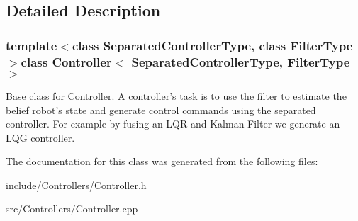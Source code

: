 \subsection{\-Detailed \-Description}
\subsubsection*{template$<$class \-Separated\-Controller\-Type, class \-Filter\-Type$>$class Controller$<$ Separated\-Controller\-Type, Filter\-Type $>$}

\-Base class for \hyperlink{class_controller}{\-Controller}. \-A controller's task is to use the filter to estimate the belief robot's state and generate control commands using the separated controller. \-For example by fusing an \-L\-Q\-R and \-Kalman \-Filter we generate an \-L\-Q\-G controller. 

\-The documentation for this class was generated from the following files\-:\begin{DoxyCompactItemize}
\item 
include/\-Controllers/\-Controller.\-h\item 
src/\-Controllers/\-Controller.\-cpp\end{DoxyCompactItemize}

